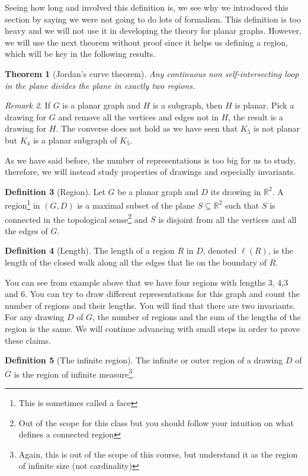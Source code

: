 \documentclass{tufte-handout}
\newtheorem{thm}{Theorem}
\theoremstyle{definition}
\newtheorem{defn}[thm]{Definition}
\theoremstyle{remark}
\newtheorem{rem}[thm]{Remark}
\newcommand{\R}{\mathbb{R}}
\begin{document}
Seeing how long and involved this definition is, we see why we introduced this section by saying we were not going to do lots of formalism. This definition is too heavy and we will not use it in developing the theory for planar graphs. However, we will use the next theorem without proof since it helps us defining a region, which will be key in the following results.
\begin{thm}[Jordan's curve theorem]
	Any continuous non self-intersecting loop in the plane divides the plane in exactly two regions.
\end{thm}
\begin{rem}
	If $G$ is a planar graph and $H$ is a subgraph, then $H$ is planar. Pick a drawing for $G$ and remove all the vertices and edges not in $H$, the result is a drawing for $H$. The converse does not hold as we have seen that $K_5$ is not planar but $K_4$ is a planar subgraph of $K_5$. 
\end{rem}
As we have said before, the number of representations is too big for us to study, therefore, we will instead study properties of drawings and especially invariants.
\begin{defn}[Region]
	Let $G$ be a planar graph and $D$ its drawing in $\R^2$. A region\footnote{This is sometimes called a face} in $(G,D)$ is a maximal subset of the plane $S \subseteq \R^2$ such that $S$ is connected in the topological sense\footnote{Out of the scope for this class but you should follow your intuition on what defines a connected region} and $S$ is disjoint from all the vertices and all the edges of $G$. %
\end{defn}
\begin{defn}[Length]
	The length of a region $R$ in $D$, denoted $\ell(R)$, is the length of the closed walk along all the edges that lie on the boundary of $R$.
\end{defn}
You can see from example above that we have four regions with lengths 3, 4,3 and 6. You can try to draw different representations for this graph and count the number of regions and their lengths. You will find that there are two invariants. For any drawing $D$ of $G$, the number of regions and the sum of the lengths of the region is the same. We will continue advancing with small steps in order to prove these claims.
\begin{defn}[The infinite region]
	The infinite or outer region of a drawing $D$ of $G$ is the region of infinite measure\footnote{Again, this is out of the scope of this course, but understand it as the region of infinite size (not cardinality)}.
\end{defn}
\end{document}
